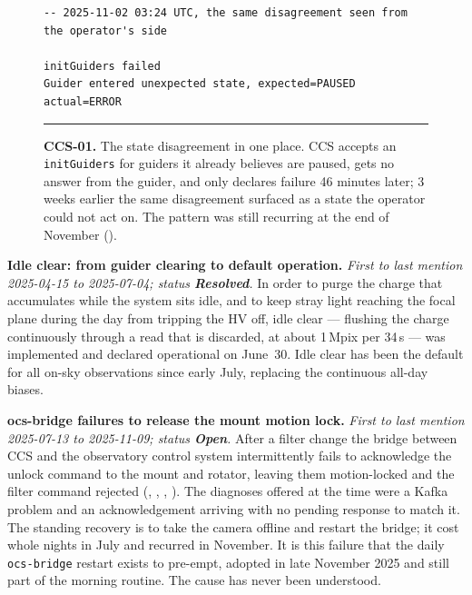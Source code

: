 \begin{description}
\begin{figure}[H]
\begin{minipage}{\textwidth}
\begin{verbatim}
-- 2025-11-02 03:24 UTC, the same disagreement seen from the operator's side

initGuiders failed
Guider entered unexpected state, expected=PAUSED actual=ERROR
\end{verbatim}
\endgroup
\vspace{-10pt}\hrule
\end{minipage}
\caption{\textbf{CCS-01.} The state disagreement in one place.  CCS accepts an \texttt{initGuiders} for guiders it already believes are paused, gets no answer from the guider, and only declares failure 46 minutes later; 3 weeks earlier the same disagreement surfaced as a state the operator could not act on.  The pattern was still recurring at the end of November ().}
\label{fig:iss-CCS-01}
\end{figure}

\item[CCS-02]\label{iss:CCS-02} \textbf{Idle clear: from guider clearing to default operation.}
  \emph{First to last mention 2025-04-15 to 2025-07-04; status \textcolor{stres}{\textbf{Resolved}}.}
  In order to purge the charge that accumulates while the system sits idle, and to keep stray light reaching the focal plane during the day from tripping the HV off, idle clear --- flushing the charge continuously through a read that is discarded, at about 1\,Mpix per 34\,s --- was implemented and declared operational on June~30.  Idle clear has been the default for all on-sky observations since early July, replacing the continuous all-day biases.

\item[CCS-03]\label{iss:CCS-03} \textbf{ocs-bridge failures to release the mount motion lock.}
  \emph{First to last mention 2025-07-13 to 2025-11-09; status \textcolor{stopn}{\textbf{Open}}.}
  After a filter change the bridge between CCS and the observatory control system intermittently fails to acknowledge the unlock command to the mount and rotator, leaving them motion-locked and the filter command rejected (, , , ).  The diagnoses offered at the time were a Kafka problem and an acknowledgement arriving with no pending response to match it.  The standing recovery is to take the camera offline and restart the bridge; it cost whole nights in July and recurred in November.  It is this failure that the daily \texttt{ocs-bridge} restart exists to pre-empt, adopted in late November 2025 and still part of the morning routine.  The cause has never been understood.


\end{description}
